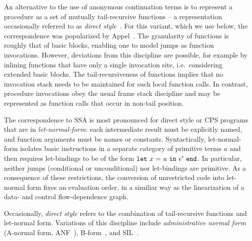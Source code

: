 An alternative to the use of anonymous continuation terms is to
represent a procedure as a set of mutually tail-recursive functions --
a representation occasionally referred to as \emph{direct
style}~\cite{Reynolds1974}. For this variant, which we use below, the
correspondence was popularized by Appel~\cite{Appel98:SSA}. The
granularity of functions is roughly that of basic blocks, enabling one
to model jumps as function invocations. However, deviations from this
discipline are possible, for example by inlining functions that have
only a single invocation site, i.e.~considering extended basic blocks.
The tail-recursiveness of functions implies that no invocation stack
needs to be maintained for such local function calls. In contrast,
procedure invocations obey the usual frame stack discipline and may be
represented as function calls that occur in non-tail position.

The correspondence to SSA is most pronounced for direct style or CPS
programs that are in \emph{let-normal-form}: each intermediate result
must be explicitly named, and function arguments must be names or
constants. Syntactically, let-normal-form isolates basic instructions
in a separate category of primitive terms $a$ and then requires
let-bindings to be of the form $\mathtt{let}\ {x}\ \mathtt{=}\ {a}\ \mathtt{in}\ {e'}\ \mathtt{end}$.  In particular,
neither jumps (conditional or unconditional) nor let-bindings are
primitive. As a consequence of these restrictions, the conversion of
unrestricted code into let-normal form fixes an evaluation order, in a
similiar way as the linearization of a data- and control
flow-dependence graph.


Occasionally, \emph{direct style} refers to the combination of
tail-recursive functions and let-normal form. Variations of this
discipline include
\emph{administrative normal form} (A-normal form, ANF~\cite{DBLP:conf/pldi/FlanaganSDF93}), B-form~\cite{DBLP:conf/pldi/TarditiMCSHL96}, and SIL~\cite{DBLP:journals/jfp/TolmachO98}. 


